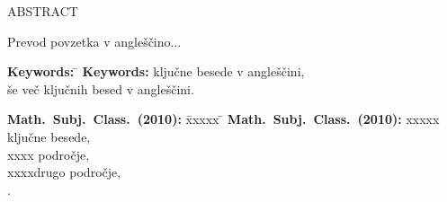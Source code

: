   \vspace{1.5cm}

  \large

  ABSTRACT

  \small

  \vspace{1.5cm}
  \begin{sloppypar}
    Prevod povzetka v angle\v s\v cino...
  \end{sloppypar}


  \vfill

  \begin{tabbing}
    \textbf{Keywords:} \=\kill
    \textbf{Keywords:}  klju\v cne besede v angle\v s\v cini,\\
    \v se ve\v c klju\v cnih besed v angle\v s\v cini.\\
  \end{tabbing}

  \begin{tabbing}
    \textbf{Math.\ Subj.\ Class.\ (2010):} \=xxxxx \=\kill
    \textbf{Math.\ Subj.\ Class.\ (2010):} \>xxxxx klju\v cne besede,\\
    \>xxxx podro\v cje,\\
    \>xxxxdrugo podro\v cje,\\\>.\\
  \end{tabbing}



